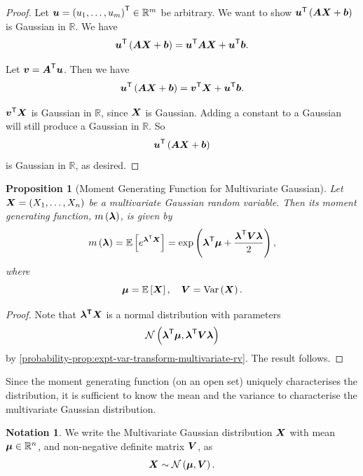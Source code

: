 \documentclass[11pt]{article}
\numberwithin{equation}{section}
\newtheorem{proposition}[theorem]{Proposition}
\theoremstyle{definition}
\newtheorem{notation}[theorem]{Notation}
\theoremstyle{remark}
\newcommand{\pqty}[1]{\left(#1\right)}
\newcommand{\bqty}[1]{\left[#1\right]}
\newcommand{\RR}{\mathbb R}
\newcommand{\transpose}{^{\mathsf T}}
\newcommand{\Expt}{\mathbb E}
\DeclareMathOperator{\Var}{Var}
\newcommand{\Normal}{\mathcal N}
\begin{document}
\begin{proof}\label{probability-proof-080}
    Let \(\vb{u} = \pqty{u_1, \ldots, u_m} \transpose \in \RR^m\) be arbitrary. We want to show \(\vb{u}\transpose \pqty{\vb{A} \vb{X} + \vb{b}}\) is Gaussian in \(\RR\). We have
    \[
        \vb{u}\transpose \pqty{\vb{A} \vb{X} + \vb{b}} = \vb{u}\transpose \vb{A} \vb{X} + \vb{u}\transpose \vb{b}.
    \]

    Let \(\vb{v} = \vb{A}\transpose \vb{u}\). Then we have
    \[
        \vb{u}\transpose \pqty{\vb{A} \vb{X} + \vb{b}} = \vb{v}\transpose \vb{X} + \vb{u}\transpose \vb{b}.
    \]

    \(\vb{v}\transpose \vb{X}\) is Gaussian in \(\RR\), since \(\vb{X}\) is Gaussian. Adding a constant to a Gaussian will still produce a Gaussian in \(\RR\). So
    \[
        \vb{u}\transpose \pqty{\vb{A} \vb{X} + \vb{b}}
    \]
    is Gaussian in \(\RR\), as desired.
\end{proof}

\begin{proposition}[Moment Generating Function for Multivariate Gaussian]\label{probability-proposition-042}
    \label{probability-prop:mgf-multivariate-gaussian}%
    Let \(\vb{X} = \pqty{X_1, \ldots, X_n}\) be a multivariate Gaussian random variable. Then its moment generating function, \(m\pqty{\vb*{\lambda}}\), is given by
    \[
        m\pqty{\vb*{\lambda}} = \Expt\bqty{e^{\vb*{\lambda} \transpose \vb{X}}} = \exp\pqty{\vb*{\lambda} \transpose \vb*{\mu} + \frac{\vb*{\lambda} \transpose \vb{V} \vb*{\lambda}}{2}},
    \]
    where
    \[
        \vb*{\mu} = \Expt\bqty{\vb{X}}, \quad \vb{V} = \Var\pqty{\vb{X}}.
    \]
\end{proposition}

\begin{proof}\label{probability-proof-081}
    Note that \(\vb*{\lambda \transpose \vb{X}}\) is a normal distribution with parameters
    \[
        \Normal\pqty{\vb*{\lambda}\transpose\vb*{\mu}, \vb*{\lambda}\transpose \vb{V} \vb*{\lambda}}
    \]
    by \autoref{probability-prop:expt-var-transform-multivariate-rv}. The result follows.
\end{proof}

Since the moment generating function (on an open set) uniquely characterises the distribution, it is sufficient to know the mean and the variance to characterise the multivariate Gaussian distribution.

\begin{notation}\label{probability-notation-003}
    We write the Multivariate Gaussian distribution \(\vb{X}\) with mean \(\vb*{\mu} \in \RR^n\), and non-negative definite matrix \(\vb{V}\), as
    \[
        \vb{X} \sim \Normal\pqty{\vb*{\mu}, \vb{V}}.
    \]
\end{notation}
\end{document}
